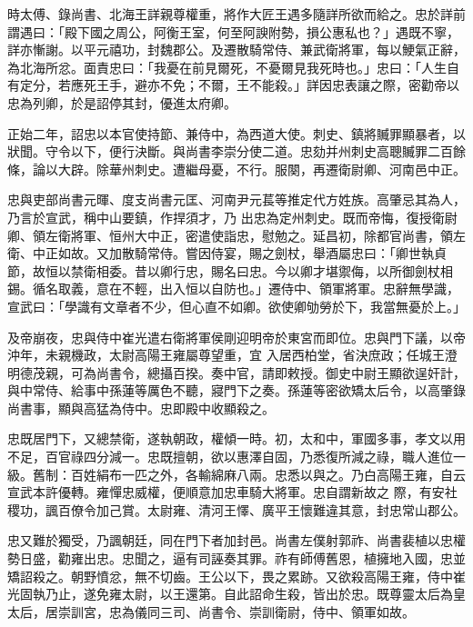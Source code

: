\begin{pinyinscope}
 時太傅、錄尚書、北海王詳親尊權重，將作大匠王遇多隨詳所欲而給之。忠於詳前謂遇曰：「殿下國之周公，阿衡王室，何至阿諛附勢，損公惠私也？」遇既不寧，詳亦慚謝。以平元禧功，封魏郡公。及遷散騎常侍、兼武衛將軍，每以鯁氣正辭，
 為北海所忿。面責忠曰：「我憂在前見爾死，不憂爾見我死時也。」忠曰：「人生自有定分，若應死王手，避亦不免；不爾，王不能殺。」詳因忠表讓之際，密勸帝以忠為列卿，於是詔停其封，優進太府卿。



 正始二年，詔忠以本官使持節、兼侍中，為西道大使。刺史、鎮將贓罪顯暴者，以狀聞。守令以下，便行決斷。與尚書李崇分使二道。忠劾并州刺史高聰贓罪二百餘條，論以大辟。除華州刺史。遭繼母憂，不行。服闋，再遷衛尉卿、河南邑中正。



 忠與吏部尚書元暉、度支尚書元匡、河南尹元萇等推定代方姓族。高肇忌其為人，乃言於宣武，稱中山要鎮，作捍須才，乃
 出忠為定州刺史。既而帝悔，復授衛尉卿、領左衛將軍、恒州大中正，密遣使詣忠，慰勉之。延昌初，除都官尚書，領左衛、中正如故。又加散騎常侍。嘗因侍宴，賜之劍杖，舉酒屬忠曰：「卿世執貞節，故恒以禁衛相委。昔以卿行忠，賜名曰忠。今以卿才堪禦侮，以所御劍杖相錫。循名取義，意在不輕，出入恒以自防也。」遷侍中、領軍將軍。忠辭無學識，宣武曰：「學識有文章者不少，但心直不如卿。欲使卿劬勞於下，我當無憂於上。」



 及帝崩夜，忠與侍中崔光遣右衛將軍侯剛迎明帝於東宮而即位。忠與門下議，以帝沖年，未親機政，太尉高陽王雍屬尊望重，宜
 入居西柏堂，省決庶政；任城王澄明德茂親，可為尚書令，總攝百揆。奏中官，請即敕授。御史中尉王顯欲逞奸計，與中常侍、給事中孫蓮等厲色不聽，寢門下之奏。孫蓮等密欲矯太后令，以高肇錄尚書事，顯與高猛為侍中。忠即殿中收顯殺之。



 忠既居門下，又總禁衛，遂執朝政，權傾一時。初，太和中，軍國多事，孝文以用不足，百官祿四分減一。忠既擅朝，欲以惠澤自固，乃悉復所減之祿，職人進位一級。舊制：百姓絹布一匹之外，各輸綿麻八兩。忠悉以與之。乃白高陽王雍，自云宣武本許優轉。雍憚忠威權，便順意加忠車騎大將軍。忠自謂新故之
 際，有安社稷功，諷百僚令加己賞。太尉雍、清河王懌、廣平王懷難違其意，封忠常山郡公。



 忠又難於獨受，乃諷朝廷，同在門下者加封邑。尚書左僕射郭祚、尚書裴植以忠權勢日盛，勸雍出忠。忠聞之，逼有司誣奏其罪。祚有師傅舊恩，植擁地入國，忠並矯詔殺之。朝野憤忿，無不切齒。王公以下，畏之累跡。又欲殺高陽王雍，侍中崔光固執乃止，遂免雍太尉，以王還第。自此詔命生殺，皆出於忠。既尊靈太后為皇太后，居崇訓宮，忠為儀同三司、尚書令、崇訓衛尉，侍中、領軍如故。




\end{pinyinscope}
